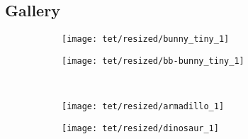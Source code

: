 \subsection{Gallery}

\begin{figure}[!htbp]
    \begin{center}
        \quad
        \begin{subfigure}[b]{0.45\textwidth}
            \centering
            \texttt{[image: tet/resized/bunny\_tiny\_1]}
        \end{subfigure}
        \begin{subfigure}[b]{0.45\textwidth}
            \centering
            \texttt{[image: tet/resized/bb-bunny\_tiny\_1]}
        \end{subfigure}\\ 

        \quad
        \begin{subfigure}[b]{0.45\textwidth}
            \centering
            \texttt{[image: tet/resized/armadillo\_1]}
        \end{subfigure}
        \begin{subfigure}[b]{0.45\textwidth}
            \centering
            \texttt{[image: tet/resized/dinosaur\_1]}
        \end{subfigure}\\ 

    \end{center}
\end{figure}